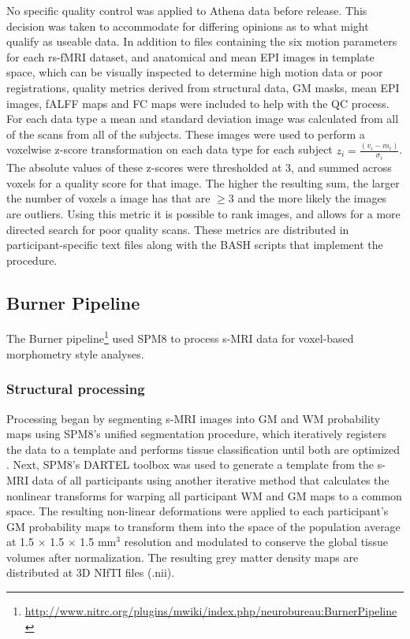 \documentclass[preprint,12pt,3p]{elsarticle}
\begin{document}
No specific quality control was applied to Athena data before release. This decision was taken to accommodate for differing opinions as to what might qualify as useable data. In addition to files containing the six motion parameters for each rs-fMRI dataset, and anatomical and mean EPI images in template space, which can be visually inspected to determine high motion data or poor registrations, quality metrics derived from structural data, GM masks, mean EPI images, fALFF maps and FC maps were included to help with the QC process. %
For each data type a mean and standard deviation image was calculated from all of the scans from all of the subjects. These images were used to perform a voxelwise z-score transformation on each data type for each subject $z_i = \frac{(v_i-m_i)}{\sigma_i}$. The absolute values of these z-scores were thresholded at 3, and summed across voxels for a quality score for that image. The higher the resulting sum, the larger the number of voxels a image has that are $\geq 3$ and the more likely the images are outliers. Using this metric it is possible to rank images, and allows for a more directed search for poor quality scans. These metrics are distributed in participant-specific text files along with the BASH scripts that implement the procedure.

\subsection{Burner Pipeline}

The Burner pipeline\footnote{\url{http://www.nitrc.org/plugins/mwiki/index.php/neurobureau:BurnerPipeline}} used SPM8 \cite{ashburner2012spm8} to process s-MRI data for voxel-based morphometry \cite{ashburner2000vbm} style analyses.

\subsubsection{Structural processing} 

Processing began by segmenting s-MRI images into GM and WM probability maps using SPM8's unified segmentation procedure, which iteratively registers the data to a template and performs tissue classification until both are optimized \cite{ashburner2005unified}. Next, SPM8's DARTEL toolbox \cite{ashburner2007dartel} was used to generate a template from the s-MRI data of all participants using another iterative method that calculates the nonlinear transforms for warping all participant WM and GM maps to a common space. The resulting non-linear deformations were applied to each participant's GM probability maps to transform them into the space of the population average at 1.5 $\times$ 1.5 $\times$ 1.5 mm$^3$ resolution and modulated to conserve the global tissue volumes after normalization. The resulting grey matter density maps are distributed at 3D NIfTI files (.nii).
\end{document}
